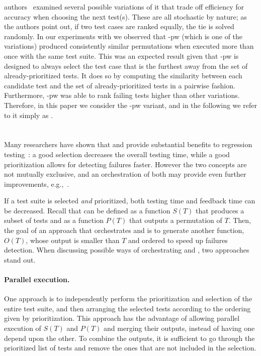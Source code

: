 \fs authors~\cite{miranda_fast} examined several possible variations of it
that trade off efficiency for accuracy when choosing the next test(s).
These are all stochastic by nature;
as the authors point out, if two test cases are ranked equally, the tie is solved randomly.
In our experiments with \fs we observed that \fs-pw (which is one of the variations) produced consistently similar permutations when executed more than once with the same test suite. 
This was an expected result given that \fs-pw is designed to always select the test case that is the furthest away from the set of already-prioritized tests.
It does so by computing the similarity between each candidate test and the set of already-prioritized tests in a pairwise fashion.
Furthermore, \fs-pw was able to rank failing tests  higher than other variations. 
Therefore, in this paper  we consider the \fs-pw variant, and in the following we refer to it simply as \fs.


\section{\fz}\label{sec:orch_fastazi}

Many researchers have shown that \tcs and \tcp  provide substantial benefits 
to regression testing~\cite{bin_ali_search_2019, kazmi_effective_2017, khatibsyarbini_test_2018, RothermelHarrold94FrameworkForEvaluationRTS}:
a good selection decreases the overall testing time, while a good prioritization allows for detecting failures faster.
However the two concepts are not mutually exclusive, and an orchestration of both may provide even further improvements, e.g.,~\cite{spieker2017reinforcement,elbaum2014techniques}.

If a test suite is selected \textit{and} prioritized, both testing time and feedback time can be decreased.
Recall that \tcs can be defined as a function $S(T)$ that produces a subset of tests and \tcp as a function $P(T)$ that outputs a permutation of $T$.
Then, the goal of an approach that orchestrates \tcs and \tcp is to generate another function, $O(T)$, 
whose output is smaller than $T$ and ordered to speed up failures detection.
When discussing possible ways of orchestrating \tcs and \tcp, two approaches stand out.

\paragraph{Parallel execution.} 
One approach is to independently perform the prioritization and selection of the entire test suite, and then arranging the selected tests according to the ordering given by prioritization.
This approach has the advantage of allowing parallel execution of $S(T)$ and $P(T)$ and merging their outputs, instead of having one depend upon the other.
To combine the outputs, it is sufficient to go through the prioritized list of tests and remove the ones that are not included in the selection.

